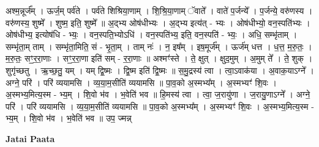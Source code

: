 \documentclass[17pt]{extarticle}
\begin{document}
अश्म॒न्नूर्ज᳚म् । ऊर्ज॒म् पर्व॑ते । पर्व॑ते शिश्रिया॒णाम् । शि॒श्रि॒या॒णाम् ॅवाते᳚ । वाते॑ प॒र्जन्ये᳚ । प॒र्जन्ये॒ वरु॑णस्य । वरु॑णस्य॒ शुष्मे᳚ । शुष्म॒ इति॒ शुष्मे᳚ ॥ अ॒द्भ्य ओष॑धीभ्यः । अ॒द्भ्य इत्य॑त् - भ्यः । ओष॑धीभ्यो॒ वन॒स्पति॑भ्यः । ओष॑धीभ्य॒ इत्योष॑धि - भ्यः॒ । वन॒स्पति॒भ्योऽधि॑ । वन॒स्पति॑भ्य॒ इति॒ वन॒स्पति॑ - भ्यः॒ । अधि॒ सम्भृ॑ताम् । सम्भृ॑ता॒म् ताम् । सम्भृ॑ता॒मिति॒ सं - भृ॒ता॒म् । ताम् नः॑ । न॒ इष᳚म् । इष॒मूर्ज᳚म् । ऊर्ज॑म् धत्त । ध॒त्त॒ म॒रु॒तः॒ । म॒रु॒तः॒ सꣳ॒॒र॒रा॒णाः । सꣳ॒॒र॒रा॒णा इति॑ सम् - र॒रा॒णाः ॥ अश्मꣳ॑स्ते । ते॒ क्षुत् । क्षुद॒मुम् । अ॒मुम् ते᳚ । ते॒ शुक् । शुगृ॑च्छतु । ऋ॒च्छ॒तु॒ यम् । यम् द्वि॒ष्मः । द्वि॒ष्म इति॑ द्वि॒ष्मः ॥ स॒मु॒द्रस्य॑ त्वा । त्वा॒ऽवाक॑या । अ॒वाक॒याऽग्ने᳚ । अग्ने॒ परि॑ । परि॑ व्ययामसि । व्य॒या॒म॒सीति॑ व्ययामसि ॥ पा॒व॒को अ॒स्मभ्य᳚म् । अ॒स्मभ्यꣳ॑ शि॒वः । अ॒स्मभ्य॒मित्य॒स्म - भ्य॒म् । शि॒वो भ॑व । भ॒वेति॑ भव ॥ हि॒मस्य॑ त्वा । त्वा॒ ज॒रायु॑णा । ज॒रायु॒णाऽग्ने᳚ । अग्ने॒ परि॑ । परि॑ व्ययामसि । व्य॒या॒म॒सीति॑ व्ययामसि ॥ पा॒व॒को अ॒स्मभ्य᳚म् । अ॒स्मभ्यꣳ॑ शि॒वः । अ॒स्मभ्य॒मित्य॒स्म - भ्य॒म् । शि॒वो भ॑व । भ॒वेति॑ भव ॥ उप॒ ज्मन्न् \newline

\textbf{Jatai Paata} \newline
\end{document}
